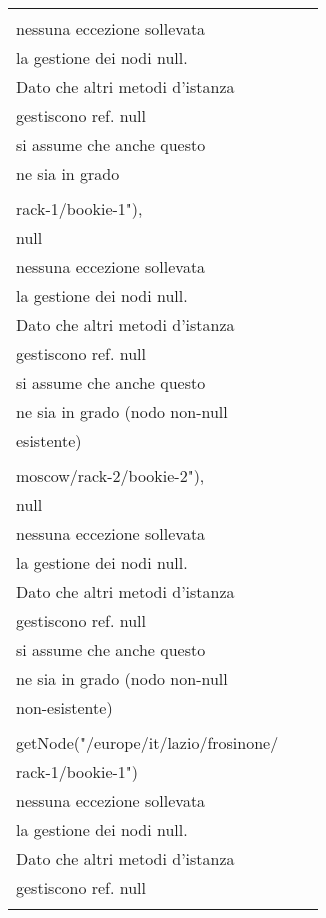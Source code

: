 \documentclass[10pt, a4paper]{article}
\newcommand{\Intmaketable}[4]{
	\begin{longtable}{#3}
	#4
	\caption{#2}
	\label{#1}
	\end{longtable}
}
\newcommand{\Inttestctable}[3]{
	\Intmaketable{#1}{#2}{|l|l|l|}{
	\hline
	\thead{Input} & \thead{Esito atteso} & \thead{Motivazione}\\
	\hline
	\hline
	#3
	\hline}
}
\newcommand{\Inttestccaption}[4]{Casi di test per metodo #1 di #2, iter. #3 (#4)}
\newcommand{\gettablelabel}[5]{table:#1:#2:#3:iter#4:proj#5}
\newcommand{\testctable}[5]{
	\Inttestctable{\gettablelabel{testc}{#1}{#2}{#3}{#4}}
		{\Inttestccaption{#1}{#2}{#3}{#4}}
		{#5}
}
\newcommand{\tcell}{\makecell[tl]}
\newcommand{\newtrow}{\\ \hline}
\def\bookkeeper{BookKeeper}
\begin{document}
	\testctable{getDistance}{NetworkTopologyImpl}{2}{\bookkeeper}{
			\tcell{
					null, null} &
			\tcell{Ritorno valore 0,\\nessuna eccezione sollevata} &
			\tcell{La documentazione non specifica\\la gestione dei nodi null.\\
					Dato che altri metodi d'istanza\\gestiscono ref. null\\
					si assume che anche questo\\ ne sia in grado}
		\newtrow
			\tcell{
					getNode("/europe/it/lazio/frosinone/\\rack-1/bookie-1"),\\
					null} &
			\tcell{Ritorno valore 0,\\nessuna eccezione sollevata} &
			\tcell{La documentazione non specifica\\la gestione dei nodi null.\\
					Dato che altri metodi d'istanza\\gestiscono ref. null\\
					si assume che anche questo\\ ne sia in grado (nodo non-null\\ esistente)}
		\newtrow
			\tcell{
					buildNode("/asia/ru/region-1/\\moscow/rack-2/bookie-2"),\\
					null} &
			\tcell{Ritorno valore 0,\\nessuna eccezione sollevata} &
			\tcell{La documentazione non specifica\\la gestione dei nodi null.\\
					Dato che altri metodi d'istanza\\gestiscono ref. null\\
					si assume che anche questo\\ ne sia in grado (nodo non-null\\ non-esistente)}
		\newtrow
			\tcell{
					null,\\
					getNode("/europe/it/lazio/frosinone/\\rack-1/bookie-1")} &
			\tcell{Ritorno valore 0,\\nessuna eccezione sollevata} &
			\tcell{La documentazione non specifica\\la gestione dei nodi null.\\
					Dato che altri metodi d'istanza\\gestiscono ref. null\\
}}
\end{document}
